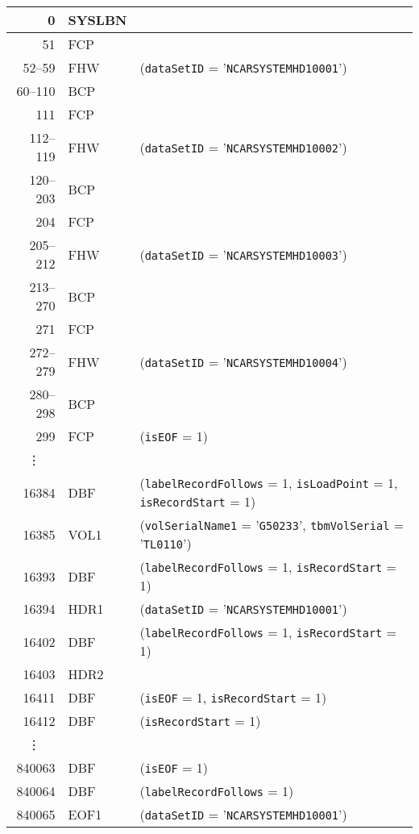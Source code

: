 \documentclass{report}
\begin{document}
\begin{center}
\label{Tbl.G50233Layout}
\begin{longtable}{rll}
\hline
      0 & SYSLBN \\
\hline
     51 & FCP \\
52--59 & FHW & (\texttt{dataSetID} = '\texttt{NCARSYSTEMHD10001}') \\
60--110 & BCP & \\
\hline
111 & FCP \\
112--119 & FHW & (\texttt{dataSetID} = '\texttt{NCARSYSTEMHD10002}') \\
120--203 & BCP \\
\hline
204 & FCP \\
205--212 & FHW & (\texttt{dataSetID} = '\texttt{NCARSYSTEMHD10003}') \\
213--270 & BCP \\
\hline
271 & FCP \\
272--279 & FHW & (\texttt{dataSetID} = '\texttt{NCARSYSTEMHD10004}') \\
280--298 & BCP \\
\hline
    299 & FCP & (\texttt{isEOF} = 1) \\
\hline
\multicolumn{1}{c}{\vdots} \\
\hline
  16384 & DBF  & (\texttt{labelRecordFollows} = 1, \texttt{isLoadPoint} = 1, \texttt{isRecordStart} = 1) \\
\hline
  16385 & VOL1 & (\texttt{volSerialName1} = '\texttt{G50233}', \texttt{tbmVolSerial} = '\texttt{TL0110}') \\
  16393 & DBF  & (\texttt{labelRecordFollows} = 1, \texttt{isRecordStart} = 1) \\
  16394 & HDR1 & (\texttt{dataSetID} = '\texttt{NCARSYSTEMHD10001}') \\
  16402 & DBF  & (\texttt{labelRecordFollows} = 1, \texttt{isRecordStart} = 1) \\
  16403 & HDR2 & \\
  16411 & DBF  & (\texttt{isEOF} = 1, \texttt{isRecordStart} = 1) \\
\hline
  16412 & DBF  & (\texttt{isRecordStart} = 1) \\
\multicolumn{1}{c}{\vdots} \\
 840063 & DBF & (\texttt{isEOF} = 1) \\
\hline
 840064 & DBF  & (\texttt{labelRecordFollows} = 1) \\
 840065 & EOF1 & (\texttt{dataSetID} = '\texttt{NCARSYSTEMHD10001}') \\

\end{longtable}
\end{center}
\end{document}
